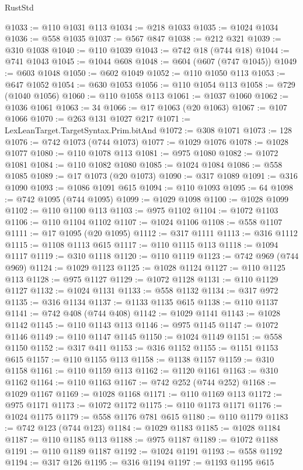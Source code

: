 \begin{lexlean}{RustStd}
\begin{coremodule}
{\begin{coremodule}
{{{{{{{{{{{{{{{{{{{{{{{{{{{{{{{{{{{{{{{{{{{{{@1033 := @110 @1031 @113
@1034 := @218 @1033
@1035 := @1024 @1034
@1036 := @558 @1035
@1037 := @567 @847
@1038 := @212 @321
@1039 := @310 @1038
@1040 := @110 @1039
@1043 := @742 @18 (@744 @18)
@1044 := @741 @1043
@1045 := @1044 @608
@1048 := @604 (@607 (@747 @1045))
@1049 := @603 @1048
@1050 := @602 @1049
@1052 := @110 @1050 @113
@1053 := @647 @1052
@1054 := @630 @1053
@1056 := @110 @1054 @113
@1058 := @729 (@1040 @1056)
@1060 := @110 @1058 @113
@1061 := @1037 @1060
@1062 := @1036 @1061
@1063 := 34
@1066 := @17 @1063 (@20 @1063)
@1067 := @107 @1066
@1070 := @263 @131 @1027 @217
@1071 := LexLeanTarget.TargetSyntax.Prim.bitAnd
@1072 := @308 @1071
@1073 := 128
@1076 := @742 @1073 (@744 @1073)
@1077 := @1029 @1076
@1078 := @1028 @1077
@1080 := @110 @1078 @113
@1081 := @975 @1080
@1082 := @1072 @1081
@1084 := @110 @1082 @1080
@1085 := @1024 @1084
@1086 := @558 @1085
@1089 := @17 @1073 (@20 @1073)
@1090 := @317 @1089
@1091 := @316 @1090
@1093 := @1086 @1091 @615
@1094 := @110 @1093
@1095 := 64
@1098 := @742 @1095 (@744 @1095)
@1099 := @1029 @1098
@1100 := @1028 @1099
@1102 := @110 @1100 @113
@1103 := @975 @1102
@1104 := @1072 @1103
@1106 := @110 @1104 @1102
@1107 := @1024 @1106
@1108 := @558 @1107
@1111 := @17 @1095 (@20 @1095)
@1112 := @317 @1111
@1113 := @316 @1112
@1115 := @1108 @1113 @615
@1117 := @110 @1115 @113
@1118 := @1094 @1117
@1119 := @310 @1118
@1120 := @110 @1119
@1123 := @742 @969 (@744 @969)
@1124 := @1029 @1123
@1125 := @1028 @1124
@1127 := @110 @1125 @113
@1128 := @975 @1127
@1129 := @1072 @1128
@1131 := @110 @1129 @1127
@1132 := @1024 @1131
@1133 := @558 @1132
@1134 := @317 @972
@1135 := @316 @1134
@1137 := @1133 @1135 @615
@1138 := @110 @1137
@1141 := @742 @408 (@744 @408)
@1142 := @1029 @1141
@1143 := @1028 @1142
@1145 := @110 @1143 @113
@1146 := @975 @1145
@1147 := @1072 @1146
@1149 := @110 @1147 @1145
@1150 := @1024 @1149
@1151 := @558 @1150
@1152 := @317 @411
@1153 := @316 @1152
@1155 := @1151 @1153 @615
@1157 := @110 @1155 @113
@1158 := @1138 @1157
@1159 := @310 @1158
@1161 := @110 @1159 @113
@1162 := @1120 @1161
@1163 := @310 @1162
@1164 := @110 @1163
@1167 := @742 @252 (@744 @252)
@1168 := @1029 @1167
@1169 := @1028 @1168
@1171 := @110 @1169 @113
@1172 := @975 @1171
@1173 := @1072 @1172
@1175 := @110 @1173 @1171
@1176 := @1024 @1175
@1179 := @558 @1176 @781 @615
@1180 := @110 @1179
@1183 := @742 @123 (@744 @123)
@1184 := @1029 @1183
@1185 := @1028 @1184
@1187 := @110 @1185 @113
@1188 := @975 @1187
@1189 := @1072 @1188
@1191 := @110 @1189 @1187
@1192 := @1024 @1191
@1193 := @558 @1192
@1194 := @317 @126
@1195 := @316 @1194
@1197 := @1193 @1195 @615
}}}}}}}}}}}}}}}}}}}}}}}}}}}}}}}}}}}}}}}}}}}}}
\end{coremodule}}
\end{coremodule}
\end{lexlean}
